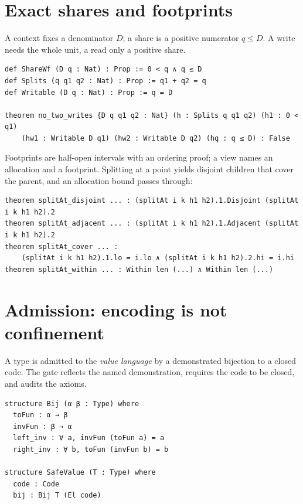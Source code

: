 \documentclass[10pt,a4paper]{article}
\newcommand{\file}[1]{\texttt{\small #1}}
\begin{document}
\section{Exact shares and footprints}

A context fixes a denominator $D$; a share is a positive numerator $q \le D$. A
write needs the whole unit, a read only a positive share.

\begin{lstlisting}[caption={\file{Cap/Share.lean}: the one-transfer theorem.}]
def ShareWf (D q : Nat) : Prop := 0 < q ∧ q ≤ D
def Splits (q q1 q2 : Nat) : Prop := q1 + q2 = q
def Writable (D q : Nat) : Prop := q = D

theorem no_two_writes {D q q1 q2 : Nat} (h : Splits q q1 q2) (h1 : 0 < q1)
    (hw1 : Writable D q1) (hw2 : Writable D q2) (hq : q ≤ D) : False
\end{lstlisting}

Footprints are half-open intervals with an ordering proof; a view names an
allocation and a footprint. Splitting at a point yields disjoint children that
cover the parent, and an allocation bound passes through:

\begin{lstlisting}[caption={\file{Cap/Footprint.lean}, selected facts.}]
theorem splitAt_disjoint ... : (splitAt i k h1 h2).1.Disjoint (splitAt i k h1 h2).2
theorem splitAt_adjacent ... : (splitAt i k h1 h2).1.Adjacent (splitAt i k h1 h2).2
theorem splitAt_cover ... :
    (splitAt i k h1 h2).1.lo = i.lo ∧ (splitAt i k h1 h2).2.hi = i.hi
theorem splitAt_within ... : Within len (...) ∧ Within len (...)
\end{lstlisting}

\section{Admission: encoding is not confinement}

A type is admitted to the \emph{value language} by a demonstrated bijection to a
closed code. The gate reflects the named demonstration, requires the code to be
closed, and audits the axioms.

\begin{lstlisting}[caption={\file{Cap/Admission.lean}.}]
structure Bij (α β : Type) where
  toFun : α → β
  invFun : β → α
  left_inv : ∀ a, invFun (toFun a) = a
  right_inv : ∀ b, toFun (invFun b) = b

structure SafeValue (T : Type) where
  code : Code
  bij : Bij T (El code)
\end{lstlisting}
\end{document}
